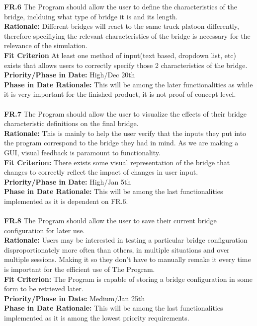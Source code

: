 \documentclass[12pt]{article}
\begin{document}
  \noindent\textbf{FR.6} The Program should allow the user to define the characteristics of the bridge, inclduing what type of bridge it is and its length.\\
  \textbf{Rationale:} Different bridges will react to the same truck platoon differently, therefore specifiying the relevant characteristics of the bridge is necessary for
  the relevance of the simulation.\\
  \textbf{Fit Criterion} At least one method of input(text based, dropdown list, etc) exists that allows users to correctly specify those 2 characteristics of the bridge.\\
  \textbf{Priority/Phase in Date:} High/Dec 20th\\
  \textbf{Phase in Date Rationale:} This will be among the later functionalities as while it is very important for the finished product, it is not proof of concept level.\\\\
  
  \noindent\textbf{FR.7} The Program should allow the user to visualize the effects of their bridge characteristic definitions on the final bridge.\\
  \textbf{Rationale:} This is mainly to help the user verify that the inputs they put into the program correspond to the bridge they had in mind. As we are making a GUI,
  visual feedback is paramount to functionality.\\
  \textbf{Fit Criterion:} There exists some visual representation of the bridge that changes to correctly reflect the impact of changes in user input.\\
  \textbf{Priority/Phase in Date:} High/Jan 5th\\
  \textbf{Phase in Date Rationale:} This will be among the last functionalities implemented as it is dependent on FR.6.\\\\
  
  \noindent\textbf{FR.8} The Program should allow the user to save their current bridge configuration for later use.\\
  \textbf{Rationale:} Users may be interested in testing a particular bridge configuration disproportionately more often than others, in multiple situations
   and over multiple sessions. Making it so they don't have to manually remake it every time is important for the efficient use of The Program.\\
  \textbf{Fit Criterion:} The Program is capable of storing a bridge configuration in some form to be retrieved later.\\
  \textbf{Priority/Phase in Date:} Medium/Jan 25th\\
  \textbf{Phase in Date Rationale:} This will be among the last functionalities implemented as it is among the lowest priority requirements.\\\\
\end{document}

